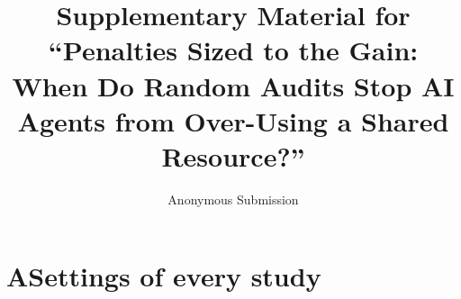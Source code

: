\documentclass[10pt,letterpaper]{article}
\title{Supplementary Material for\\``Penalties Sized to the Gain: When Do Random Audits Stop AI Agents from Over-Using a Shared Resource?''}
\author{Anonymous Submission}
\date{}
\newcommand{\game}[1]{\textsc{#1}}
\begin{document}
\maketitle

\FloatBarrier
\section*{A\quad Settings of every study}
\begin{table}[!ht]
  \centering\small
  \caption{The settings of every study. All simulations: 80 rounds, 64 new populations. LLM studies: 20 rounds, 10 populations. Audits random with probability $1/6$ per agent and round (T1 and C1: one audit per round; the memory grid of Figure~2a, R2 and R5: two audits per round in \game{Fishery} and \game{Forest}, and one in \game{River}, R4). Cheaters' over-take level chosen on 8 training populations (S1--S4) or 32 (R2, R3, S5). $^a$\game{Fishery}: stock below 50 after fishing; \game{Forest}: more than a 5\% chance that mean plot health falls below 10; R1 also reports the one-step line, which the \game{Fishery} parts of S1 and S1b used. $^b$Chosen by search to maximise the cheaters' payoff over the whole game. $^c$S4 and S5 cut a caught agent's allowance by the share of the cut it took back; L2 by its mean tonnes over. $^d$\game{River}: quality below 30 (pre-registered) and below 50. $^e$Part A compares reviewers built for the 30 line, so 30 is kept.}
  \label{tab:settings}
\end{table}
\end{document}
